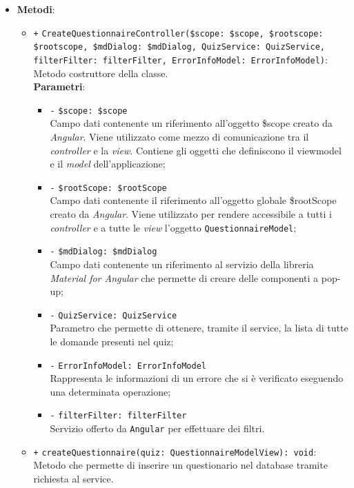 \begin{itemize}
\begin{itemize}
	\end{itemize}
	\item \textbf{Metodi}:
	\begin{itemize}
		\item \texttt{+} \texttt{CreateQuestionnaireController(\$scope: \$scope, \$rootscope: \$rootscope, \$mdDialog: \$mdDialog, QuizService: QuizService, filterFilter: filterFilter, ErrorInfoModel: ErrorInfoModel)}: \\ Metodo costruttore della classe. \\
		\textbf{Parametri}:
		\begin{itemize}
			\item \texttt{-} \texttt{\$scope: \$scope} \\
			Campo dati contenente un riferimento all'oggetto \$scope creato da \textit{Angular}. Viene utilizzato come mezzo di comunicazione tra il \textit{controller} e la \textit{view}. Contiene gli oggetti che definiscono il viewmodel e il \textit{model} dell'applicazione;
			\item \texttt{-} \texttt{\$rootScope: \$rootScope} \\
			Campo dati contenente il riferimento all'oggetto globale \$rootScope creato da \textit{Angular}. Viene utilizzato per rendere accessibile a tutti i \textit{controller} e a tutte le \textit{view} l'oggetto \texttt{QuestionnaireModel};
			\item \texttt{-} \texttt{\$mdDialog: \$mdDialog} \\
			Campo dati contenente un riferimento al servizio della libreria \textit{Material for Angular} che permette di creare delle componenti a pop-up;
			\item \texttt{-} \texttt{QuizService: QuizService}\\ Parametro che permette di ottenere, tramite il service, la lista di tutte le domande presenti nel quiz;
			\item \texttt{-} \texttt{ErrorInfoModel: ErrorInfoModel}\\ Rappresenta le informazioni di un errore che si è verificato eseguendo una determinata operazione;
			\item \texttt{-} \texttt{filterFilter: filterFilter}\\ Servizio offerto da \texttt{Angular} per effettuare dei filtri.
		\end{itemize}
		\item \texttt{+} \texttt{createQuestionnaire(quiz: QuestionnaireModelView): void}: \\Metodo che permette di inserire un questionario nel database tramite richiesta al service. \\

\end{itemize}
\end{itemize}
